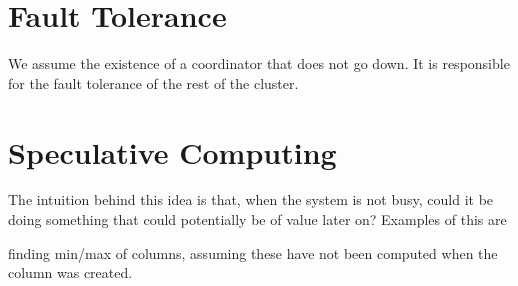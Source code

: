 \begin{figure}[hb]
\begin{center}
\end{center}
\end{figure}

\section{Fault Tolerance}
\label{fault_tolerance}

We assume the existence of a coordinator that does not go down. It is
responsible for the fault tolerance of the rest of the cluster.

\section{Speculative Computing}
\label{Speculative_Computing}

The intuition behind this idea is that, when the system is not busy,
could it be doing something that could potentially be of value later
on? Examples of this are
\be
\item finding min/max of columns, assuming these have not been computed
when the column was created. 
\ee

